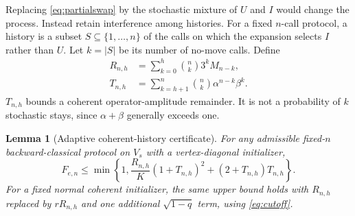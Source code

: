 \documentclass[11pt]{article}
\newtheorem{lemma}[theorem]{Lemma}
\begin{document}
Replacing \eqref{eq:partialswap} by the stochastic mixture of $U$ and $I$ would change the process. Instead retain interference among histories. For a fixed $n$-call protocol, a history is a subset $S\subseteq\{1,\ldots,n\}$ of the calls on which the expansion selects $I$ rather than $U$. Let $k=|S|$ be its number of no-move calls. Define
\begin{align}
 R_{n,h}&=\sum_{k=0}^{h}\binom nk3^kM_{n-k},\label{eq:Rhistory}\\
 T_{n,h}&=\sum_{k=h+1}^{n}\binom nk\alpha^{n-k}\beta^k.\label{eq:Thistory}
\end{align}
$T_{n,h}$ bounds a coherent operator-amplitude remainder. It is not a probability of $k$ stochastic stays, since $\alpha+\beta$ generally exceeds one.

\begin{lemma}[Adaptive coherent-history certificate]\label{lem:history}
For any admissible fixed-$n$ backward-classical protocol on $V_s$ with a vertex-diagonal initializer,
\begin{equation}
 F_{e,n}\le\min\left\{1,\frac{R_{n,h}}K(1+T_{n,h})^2+
                 (2+T_{n,h})T_{n,h}\right\}.\label{eq:historyfe}
\end{equation}
For a fixed normal coherent initializer, the same upper bound holds with $R_{n,h}$ replaced by $rR_{n,h}$ and one additional $\sqrt{1-q}$ term, using \eqref{eq:cutoff}.
\end{lemma}
\end{document}
